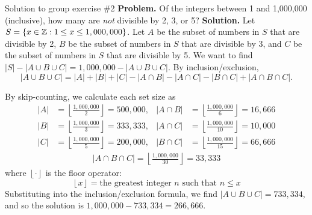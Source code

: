 \documentclass[10pt]{beamer}
\begin{document}
\begin{frame}{Solution to group exercise \#2}
\footnotesize 
\textbf{Problem.} Of the integers between 1 and 1,000,000 (inclusive), how many are \textit{not} divisible by 2, 3, or 5?
\vfill 
\textbf{Solution.}  Let $S=\{ {x \in \mathbb{Z} : 1 \leq x \leq 1,000,000} \}$.   Let $A$ be the subset of numbers in $S$ that are divisible by 2, $B$ be the subset of numbers in $S$ that are divisible by 3, and $C$ be the subset of numbers in $S$ that are divisible by 5.  We want to find $|S| - |A \cup B \cup C| = 1,000,000 - |A \cup B \cup C| $.  By inclusion/exclusion,
\[ 
|A \cup B \cup C| = |A| + |B| + |C| - |A \cap B| - |A \cap C| - |B \cap C| + |A \cap B \cap C|. \]

By skip-counting, we calculate each set size as
\begin{align*}
|A| &= \left\lfloor \frac{1,000,000}{2} \right\rfloor = 500,000, &  |A \cap B| &= \left\lfloor \frac{1,000,000}{6} \right\rfloor =16,666\\
|B| &= \left\lfloor \frac{1,000,000}{3} \right\rfloor = 333,333, &  |A \cap C| &= \left\lfloor \frac{1,000,000}{10} \right\rfloor =10,000\\
|C| &= \left\lfloor \frac{1,000,000}{5} \right\rfloor = 200,000, &  |B \cap C| &= \left\lfloor \frac{1,000,000}{15} \right\rfloor =66,666
\end{align*}
%
\begin{align*}
|A \cap B \cap C| = \left\lfloor \frac{1,000,000}{30} \right\rfloor =33,333	
\end{align*}
%
where $\left\lfloor \cdot  \right\rfloor$ is the floor operator:
\[ \left\lfloor  x \right\rfloor = \text {the greatest integer $n$ such that $n \leq x$} \]
Substituting into the inclusion/exclusion formula, we find $|A \cup B \cup C|=733,334$, and so the solution is $1,000,000 - 733,334 = 266,666.$
\end{frame}
\end{document}
